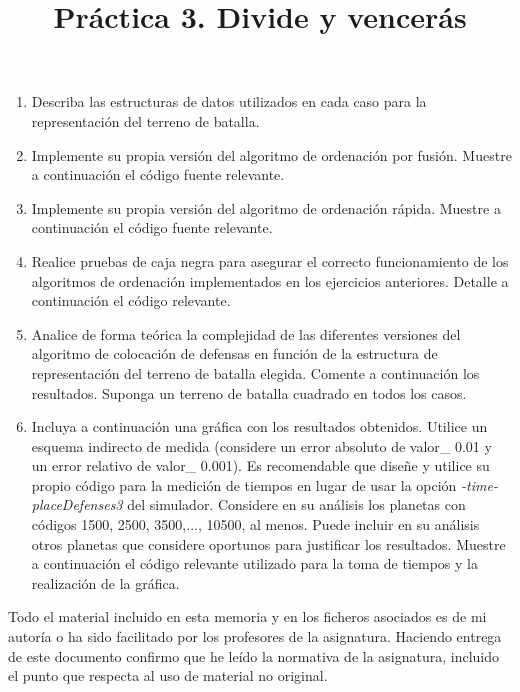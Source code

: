 \documentclass[]{article}
\title{Práctica 3. Divide y vencerás}
\author{}
\begin{document}
\maketitle


%

\begin{enumerate}
\item Describa las estructuras de datos utilizados en cada caso para la representación del terreno de batalla. 



\item Implemente su propia versión del algoritmo de ordenación por fusión. Muestre a continuación el código fuente relevante. 




\item Implemente su propia versión del algoritmo de ordenación rápida. Muestre a continuación el código fuente relevante. 



\item Realice pruebas de caja negra para asegurar el correcto funcionamiento de los algoritmos de ordenación implementados en los ejercicios anteriores. Detalle a continuación el código relevante.



\item Analice de forma teórica la complejidad de las diferentes versiones del algoritmo de colocación de defensas en función de la estructura de representación del terreno de batalla elegida. Comente a continuación los resultados. Suponga un terreno de batalla cuadrado en todos los casos. 



\item Incluya a continuación una gráfica con los resultados obtenidos. Utilice un esquema indirecto de medida (considere un error absoluto de valor\_ 0.01 y un error relativo de valor\_ 0.001). Es recomendable que diseñe y utilice su propio código para la medición de tiempos en lugar de usar la opción \emph{-time-placeDefenses3} del simulador. Considere en su análisis los planetas con códigos 1500, 2500, 3500,..., 10500, al menos. Puede incluir en su análisis otros planetas que considere oportunos para justificar los resultados. Muestre a continuación el código relevante utilizado para la toma de tiempos y la realización de la gráfica.



\end{enumerate}

Todo el material incluido en esta memoria y en los ficheros asociados es de mi autoría o ha sido facilitado por los profesores de la asignatura. Haciendo entrega de este documento confirmo que he leído la normativa de la asignatura, incluido el punto que respecta al uso de material no original.
\end{document}
